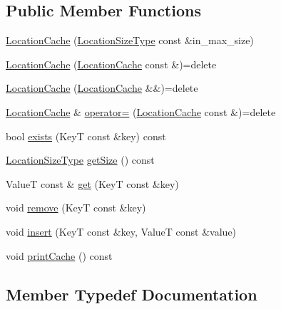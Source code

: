 \subsection*{Public Member Functions}
\begin{DoxyCompactItemize}
\item 
\hyperlink{structvt_1_1location_1_1_location_cache_a5a43f6d320c5b23dbb819e9bc74deeeb}{Location\+Cache} (\hyperlink{namespacevt_1_1location_ab1c4c5849012a23eee2fbd1fce6159d7}{Location\+Size\+Type} const \&in\+\_\+max\+\_\+size)
\item 
\hyperlink{structvt_1_1location_1_1_location_cache_a577179b586e3aa1a3d2b3c5dd6a10229}{Location\+Cache} (\hyperlink{structvt_1_1location_1_1_location_cache}{Location\+Cache} const \&)=delete
\item 
\hyperlink{structvt_1_1location_1_1_location_cache_a91afbec548074cb2fb55ed1c7f955803}{Location\+Cache} (\hyperlink{structvt_1_1location_1_1_location_cache}{Location\+Cache} \&\&)=delete
\item 
\hyperlink{structvt_1_1location_1_1_location_cache}{Location\+Cache} \& \hyperlink{structvt_1_1location_1_1_location_cache_ad57243480dae150942e6e4d8ede1bba8}{operator=} (\hyperlink{structvt_1_1location_1_1_location_cache}{Location\+Cache} const \&)=delete
\item 
bool \hyperlink{structvt_1_1location_1_1_location_cache_a2e2f1c3ef1611782da77635c4181eae4}{exists} (KeyT const \&key) const
\item 
\hyperlink{namespacevt_1_1location_ab1c4c5849012a23eee2fbd1fce6159d7}{Location\+Size\+Type} \hyperlink{structvt_1_1location_1_1_location_cache_ae33d5f17b36da8b414041af55fbfac2a}{get\+Size} () const
\item 
ValueT const  \& \hyperlink{structvt_1_1location_1_1_location_cache_afb4dcce28f172b1e16567025453f22d9}{get} (KeyT const \&key)
\item 
void \hyperlink{structvt_1_1location_1_1_location_cache_ac39441e200c3c3023bda193f7075f372}{remove} (KeyT const \&key)
\item 
void \hyperlink{structvt_1_1location_1_1_location_cache_a62020ee4735da790dd652f1cfcf2583d}{insert} (KeyT const \&key, ValueT const \&value)
\item 
void \hyperlink{structvt_1_1location_1_1_location_cache_a0c8f06fd5c1ff26c30c0c25b5800ba30}{print\+Cache} () const
\end{DoxyCompactItemize}


\subsection{Member Typedef Documentation}
\mbox{\label{structvt_1_1location_1_1_location_cache_aee11ea8af838d172e1834a9d0293b28d}} 
